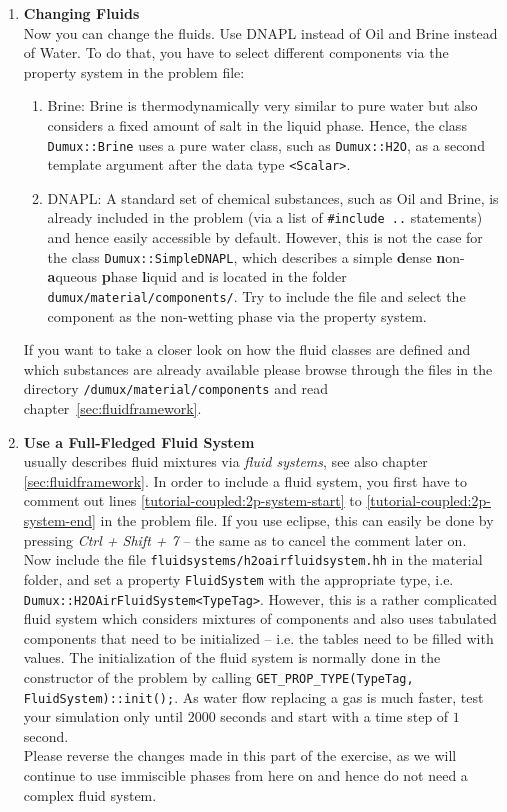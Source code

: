 \begin{enumerate}
\item \textbf{Changing Fluids} \\
Now you can change the fluids. Use DNAPL instead of Oil and Brine instead of Water. To do that, you have to select different components via the property system in the problem file:
\begin{enumerate}
 \item Brine: Brine is thermodynamically very similar to pure water but also considers a fixed amount of salt in the liquid phase. Hence, the class \texttt{Dumux::Brine} uses a pure water class, such as \texttt{Dumux::H2O}, as a second template argument after the data type \texttt{<Scalar>}.
 \item DNAPL: A standard set of chemical substances, such as Oil and Brine, is already included in the problem (via a list of \texttt{\#include ..} statements) and hence easily accessible by default. However, this is not the case for the class \texttt{Dumux::SimpleDNAPL}, which describes a simple \textbf{d}ense \textbf{n}on-\textbf{a}queous \textbf{p}hase \textbf{l}iquid and is located in the folder \texttt{dumux/material/components/}. Try to include the file and select the component as the non-wetting phase via the property system.
\end{enumerate}
If you want to take a closer look on how the fluid classes are defined and which substances are already available please browse through the files in the directory
\texttt{/dumux/material/components} and read chapter~\ref{sec:fluidframework}.

\item \textbf{Use a Full-Fledged Fluid System} \\
\Dumux usually describes fluid mixtures via \textit{fluid systems}, see also chapter \ref{sec:fluidframework}. In order to include a fluid system, you first have to comment out lines \ref{tutorial-coupled:2p-system-start} to \ref{tutorial-coupled:2p-system-end} in the problem file. If you use eclipse, this can easily be done by pressing \textit{Ctrl + Shift + 7} -- the same as to cancel the comment later on.\\
Now include the file \texttt{fluidsystems/h2oairfluidsystem.hh} in the material folder, and set a property \texttt{FluidSystem} with the appropriate type, i.e. \texttt{Dumux::H2OAirFluidSystem<TypeTag>}. However, this is a rather complicated fluid system which considers mixtures of components and also uses tabulated components that need to be initialized -- i.e. the tables need to be filled with values. The initialization of the fluid system is normally done in the constructor of the problem by calling \texttt{GET\_PROP\_TYPE(TypeTag, FluidSystem)::init();}. As water flow replacing a gas is much faster, test your simulation only until $2000$ seconds and start with a time step of $1$ second.\\
Please reverse the changes made in this part of the exercise, as we will continue to use immiscible phases from here on and hence do not need a complex fluid system.


\end{enumerate}
